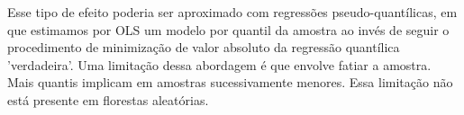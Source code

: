 Esse tipo de efeito poderia ser aproximado com regressões pseudo-quantílicas, em que estimamos por OLS um modelo por quantil da amostra ao invés de seguir o procedimento de minimização de valor absoluto da regressão quantílica 'verdadeira'. Uma limitação dessa abordagem é que envolve fatiar a amostra. Mais quantis implicam em amostras sucessivamente menores. Essa limitação não está presente em florestas aleatórias. 

\begin{figure}[H]
    \centering
\end{figure}



\begin{figure}[H]
    \centering
    
\end{figure}



